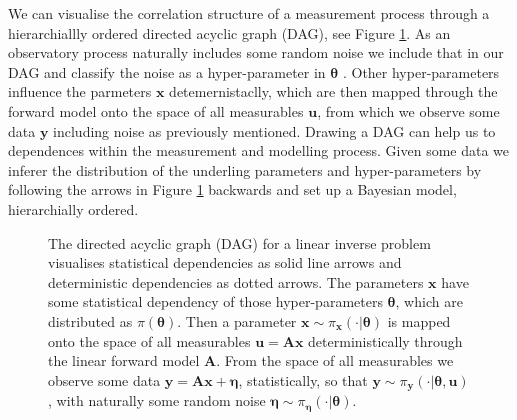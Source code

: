 We can visualise the correlation structure of a measurement process through a hierarchiallly ordered directed acyclic graph (DAG), see Figure \ref{fig:FirstDAG}.
As an observatory process naturally includes some random noise we include that in our DAG and classify the noise as a hyper-parameter in $\bm{\theta}$ \cite{fox2016fast}.
Other hyper-parameters influence the parmeters $\bm{x}$ detemernistaclly, which are then mapped through the forward model onto the space of all measurables $\bm{u}$, from which we observe some data $\bm{y}$ including noise as previously mentioned.
Drawing a DAG can help us to dependences within the measurement and modelling process.
Given some data we inferer the distribution of the underling parameters and hyper-parameters by following the arrows in Figure \ref{fig:FirstDAG} backwards and set up a Bayesian model, hierarchially ordered.
\begin{figure}[ht!]
	\centering

	\caption[Bayesian Inference DAG]{The directed acyclic graph (DAG) for a linear inverse problem visualises statistical dependencies as solid line arrows and deterministic dependencies as dotted arrows.
	The parameters $\bm{x}$ have some statistical dependency of those hyper-parameters $\bm{\theta}$, which are distributed as $\pi(\bm{\theta})$. Then a parameter $\bm{x} \sim \pi_{\bm{x}}(\cdot|\bm{\theta})$ is mapped onto the space of all measurables $\bm{u}=\bm{Ax}$ deterministically through the linear forward model $\bm{A}$.
	From the space of all measurables we observe some data $\bm{y} = \bm{Ax} + \bm{\eta}$, statistically,  so that $\bm{y}\sim \pi_{\bm{y}}(\cdot|\bm{\theta},\bm{u})$ , with naturally some random noise $\bm{\eta} \sim \pi_{\bm{\eta}}(\cdot|\bm{\theta})$.}
	\label{fig:FirstDAG}
\end{figure}



